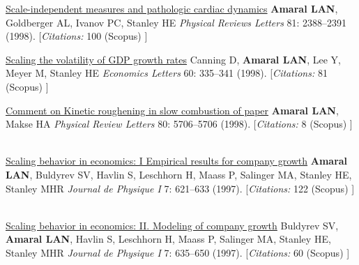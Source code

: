 \NumberedItem{\makebox[0.8cm][r]{[17]}}
\href{/people/amaral/scale-independent-measures-and-pathologic-cardiac-dynamics}
{Scale-independent measures and pathologic cardiac dynamics}
\newline
{\textbf{Amaral LAN}}, Goldberger AL, Ivanov PC, Stanley HE
\newline
\textit{Physical Reviews Letters}
    81:
2388--2391 (1998).
    [{\em{Citations:}}  100 (Scopus) ]
\newline
\Gap
~
\Gap

\NumberedItem{\makebox[0.8cm][r]{[16]}}
\href{/people/amaral/scaling-the-volatility-of-gdp-growth-rates}
{Scaling the volatility of GDP growth rates}
\newline
Canning D, {\textbf{Amaral LAN}}, Lee Y, Meyer M, Stanley HE
\newline
\textit{Economics Letters}
    60:
335--341 (1998).
    [{\em{Citations:}}  81 (Scopus) ]
\newline
\Gap
~
\Gap

\NumberedItem{\makebox[0.8cm][r]{[15]}}
\href{/people/amaral/comment-on-kinetic-roughening-in-slow-combustion-of-paper}
{Comment on Kinetic roughening in slow combustion of paper}
\newline
{\textbf{Amaral LAN}}, Makse HA
\newline
\textit{Physical Review Letters}
    80:
5706--5706 (1998).
    [{\em{Citations:}}  8 (Scopus) ]
\newline
\Gap
~
\Gap

\NumberedItem{\makebox[0.8cm][r]{[14]}}
\href{/people/amaral/scaling-behavior-in-economics-1-empirical-results-for-company-growth}
{Scaling behavior in economics: I Empirical results for company growth}
\newline
{\textbf{Amaral LAN}}, Buldyrev SV, Havlin S, Leschhorn H, Maass P, Salinger MA, Stanley HE, Stanley MHR
\newline
\textit{Journal de Physique I}
    7:
621--633 (1997).
    [{\em{Citations:}}  122 (Scopus) ]
\newline
\Gap
~
\Gap

\NumberedItem{\makebox[0.8cm][r]{[13]}}
\href{/people/amaral/scaling-behavior-in-economics-2-modeling-of-company-growth}
{Scaling behavior in economics: II. Modeling of company growth}
\newline
Buldyrev SV, {\textbf{Amaral LAN}}, Havlin S, Leschhorn H, Maass P, Salinger MA, Stanley HE, Stanley MHR
\newline
\textit{Journal de Physique I}
    7:
635--650 (1997).
    [{\em{Citations:}}  60 (Scopus) ]
\newline
\Gap
~
\Gap

